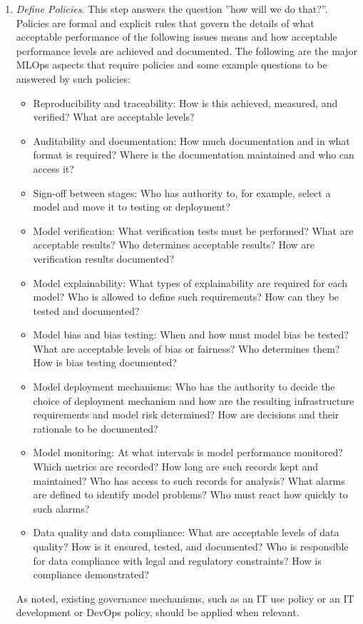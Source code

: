 \begin{enumerate}
\item \emph{Define Policies}. This step answers the question ''how will we do that?''. Policies are formal and explicit rules that govern the details of what acceptable performance of the following issues means and how acceptable performance levels are achieved and documented. The following are the major MLOps aspects that require policies and some example questions to be answered by such policies:
\begin{itemize}
   \item Reproducibility and traceability: How is this achieved, measured, and verified? What are acceptable levels?
   \item Auditability and documentation: How much documentation and in what format is required? Where is the documentation maintained and who can access it?
   \item Sign-off between stages: Who has authority to, for example, select a model and move it to testing or deployment?
   \item Model verification: What verification tests must be performed? What are acceptable results? Who determines acceptable results? How are verification results documented? 
   \item Model explainability: What types of explainability are required for each model? Who is allowed to define such requirements? How can they be tested and documented?
   \item Model bias and bias testing: When and how must model bias be tested? What are acceptable levels of bias or fairness? Who determines them? How is bias testing documented?
   \item Model deployment mechanisms: Who has the authority to decide the choice of deployment mechanism and how are the resulting infrastructure requirements and model risk determined? How are decisions and their rationale to be documented? 
   \item Model monitoring: At what intervals is model performance monitored? Which metrics are recorded? How long are such records kept and maintained? Who has access to such records for analysis? What alarms are defined to identify model problems? Who must react how quickly to such alarms? 
   \item Data quality and data compliance: What are acceptable levels of data quality? How is it ensured, tested, and documented? Who is responsible for data compliance with legal and regulatory constraints? How is compliance demonstrated?
\end{itemize}
As noted, existing governance mechanisms, such as an IT use policy or an IT development or DevOps policy, should be applied when relevant. 


\end{enumerate}
